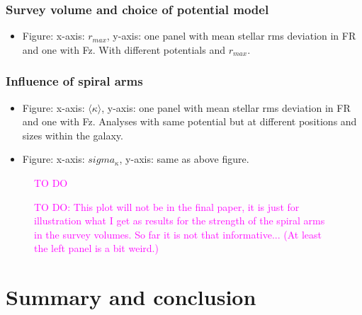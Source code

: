 \documentclass[iop,revtex4,numberedappendix,appendixfloats]{emulateapj}
\newcommand{\Wilma}[1]{\textcolor{Magenta}{#1}}
\begin{document}
\subsubsection{Survey volume and choice of potential model}

\begin{itemize}
\item Figure: x-axis: $r_{max}$, y-axis: one panel with mean stellar rms deviation in FR and one with Fz. With different potentials and $r_{max}$.
\end{itemize}

\subsubsection{Influence of spiral arms}

\begin{itemize}
\item Figure: x-axis: $\langle \kappa \rangle$, y-axis: one panel with mean stellar rms deviation in FR and one with Fz. Analyses with same potential but at different positions and sizes within the galaxy.
\item Figure: x-axis: $sigma_\kappa$, y-axis: same as above figure.
\end{itemize}

\begin{figure*}[!htbp]
\caption{\Wilma{TO DO}}
\label{fig:simulation}
\end{figure*}

\begin{figure*}[!htbp]
\caption{\Wilma{TO DO: This plot will not be in the final paper, it is just for illustration what I get as results for the strength of the spiral arms in the survey volumes. So far it is not that informative... (At least the left panel is a bit weird.)}}
\label{fig:simulation}
\end{figure*}




\section{Summary and conclusion}

{}

\end{document}

